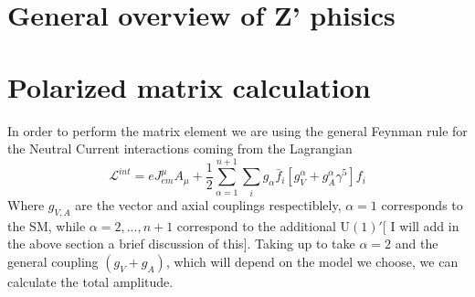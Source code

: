 \documentclass[amssymb,useAMS,prd,aps,amsmath,onecolumn,superscriptaddress,nofootinbib]{revtex4}
\begin{document}
\section{General overview of Z' phisics}
\section{Polarized matrix calculation}
In order to perform the matrix element  we are using the general Feynman rule for the Neutral Current interactions coming from the Lagrangian \cite{Langacker:2008yv}
\begin{equation}
\mathcal{L}^{int}=eJ^\mu_{em}A_\mu+\frac{1}{2}\sum_{\alpha=1}^{n+1}\sum_ig_\alpha\bar{f}_i[g_V^\alpha+g_A^\alpha\gamma^5]f_i
\end{equation}
Where $g_{V,A}$ are the vector and axial couplings respectiblely, $\alpha=1$ corresponds to the SM, while $\alpha=2,...,n+1$ correspond to the additional $\mathrm{U}(1)'$[ I will add in the above section a brief discussion of this]. Taking up to  take $\alpha=2$ and the general coupling $(g_V+g_A)$, which will depend on the model we choose, we can calculate the total amplitude.
\end{document}

